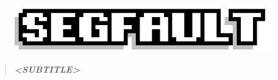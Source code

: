 \documentclass[9pt]{extarticle} %
\begin{document}

\pagestyle{fancy}
\fancyhf{}
\rhead{\today}
\addtolength\footskip{-15px}


\begin{figure}[H]
\centering\vspace{0.5cm}\includegraphics[width=0.8\linewidth]{imgs/segfault.png}
\end{figure}


\vspace{-15px}
\begin{quote}
\centering
\textbf{\textit{<SUBTITLE>}}
\end{quote}
\vspace{10px}

\end{document}
